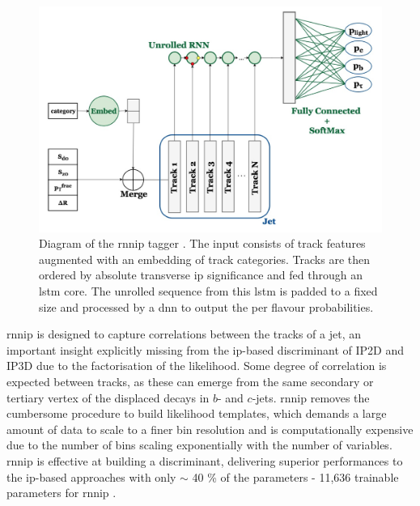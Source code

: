 \begin{figure}[h!]
  \center
  \includegraphics[scale=0.6]{Images/FTAG/rnnip_structure.png}
  \caption{Diagram of the \gls{rnnip} tagger \cite{Paganini:2289214}. The input consists of track features augmented with an embedding of track categories. Tracks are then ordered by absolute transverse \gls{ip} significance and fed through an \gls{lstm} core. The unrolled sequence from this \gls{lstm} is padded to a fixed size and processed by a \gls{dnn} to output the per flavour probabilities.} 
  \label{fig:rnnipModel}
\end{figure}

\gls{rnnip} is designed to capture correlations between the tracks of a jet, an important insight explicitly missing from the \gls{ip}-based discriminant of IP2D and IP3D due to the factorisation of the likelihood. Some degree of correlation is expected between tracks, as these can emerge from the same secondary or tertiary vertex of the displaced decays in $b$- and $c$-jets. \gls{rnnip} removes the cumbersome procedure to build likelihood templates, which demands a large amount of data to scale to a finer bin resolution and is computationally expensive due to the number of bins scaling exponentially with the number of variables. \gls{rnnip} is effective at building a discriminant, delivering superior performances to the \gls{ip}-based approaches with only $\sim$ 40 \% of the parameters - 11,636 trainable parameters for \gls{rnnip} \cite{Paganini:2289214}.

